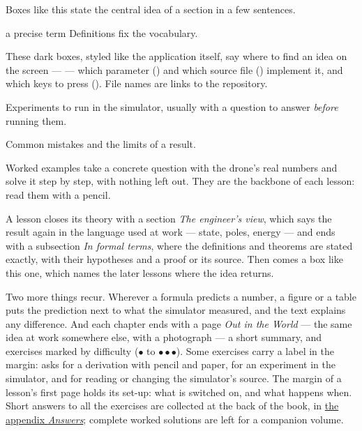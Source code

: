 \begin{keyidea}
Boxes like this state the central idea of a section in a few sentences.
\end{keyidea}
\begin{definition}{a precise term}
Definitions fix the vocabulary.
\end{definition}
\begin{inapp}
These dark boxes, styled like the application itself, say where to find an idea on the screen —  — which parameter () and which source file () implement it, and which keys to press (). File names are links to the repository.
\end{inapp}
\begin{trythis}
Experiments to run in the simulator, usually with a question to answer \emph{before} running them.
\end{trythis}
\begin{watchout}
Common mistakes and the limits of a result.
\end{watchout}
\begin{example}
Worked examples take a concrete question with the drone's real numbers and solve it step by step, with nothing left out. They are the backbone of each lesson: read them with a pencil.
\end{example}
\begin{lookahead}
A lesson closes its theory with a section \emph{The engineer's view}, which says the result again in the language used at work — state, poles, energy — and ends with a subsection \emph{In formal terms}, where the definitions and theorems are stated exactly, with their hypotheses and a proof or its source. Then comes a box like this one, which names the later lessons where the idea returns.
\end{lookahead}
Two more things recur. Wherever a formula predicts a number, a figure or a table puts the prediction next to what the simulator measured, and the text explains any difference. And each chapter ends with a page \emph{Out in the World} — the same idea at work somewhere else, with a photograph — a short summary, and exercises marked by difficulty ({\tiny$\bullet$} to {\tiny$\bullet\bullet\bullet$}). Some exercises carry a label in the margin:  asks for a derivation with pencil and paper,  for an experiment in the simulator, and  for reading or changing the simulator's source. The margin of a lesson's first page holds its set-up: what is switched on, and what happens when. Short answers to all the exercises are collected at the back of the book, in \hyperref[app:answers]{the appendix \emph{Answers}}; complete worked solutions are left for a companion volume.

